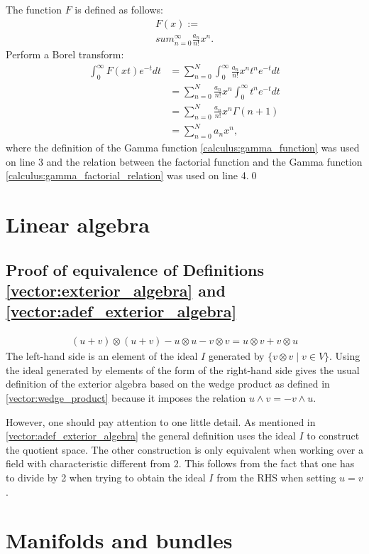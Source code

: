     The function $F$ is defined as follows:
    \begin{gather}
        F(x) := \\sum_{n=0}^\infty\frac{a_n}{n!}x^n.
    \end{gather}
    Perform a Borel transform:
    \begin{align*}
        \int_0^\infty F(xt)e^{-t}dt&=\sum_{n=0}^N\int_0^\infty\frac{a_n}{n!}x^nt^ne^{-t}dt\\
        &=\sum_{n=0}^N\frac{a_n}{n!}x^n\int_0^\infty t^ne^{-t}dt\\
        &=\sum_{n=0}^N\frac{a_n}{n!}x^n\Gamma(n+1)\\
        &=\sum_{n=0}^Na_nx^n,
   \end{align*}
   where the definition of the Gamma function \ref{calculus:gamma_function} was used on line 3 and the relation between the factorial function and the Gamma function \eqref{calculus:gamma_factorial_relation} was used on line 4.\qed

\section{Linear algebra}
\subsection{Proof of equivalence of Definitions \ref{vector:exterior_algebra} and \ref{vector:adef_exterior_algebra}}

    \begin{gather}
        (u+v)\otimes(u+v) - u\otimes u - v\otimes v = u\otimes v + v\otimes u
    \end{gather}
    The left-hand side is an element of the ideal $I$ generated by $\{v\otimes v\mid v\in V\}$. Using the ideal generated by elements of the form of the right-hand side gives the usual definition of the exterior algebra based on the wedge product as defined in \ref{vector:wedge_product} because it imposes the relation $u\wedge v = -v\wedge u$.

    However, one should pay attention to one little detail. As mentioned in \ref{vector:adef_exterior_algebra} the general definition uses the ideal $I$ to construct the quotient space. The other construction is only equivalent when working over a field with characteristic different from 2. This follows from the fact that one has to divide by 2 when trying to obtain the ideal $I$ from the RHS when setting $u=v$.

\section{Manifolds and bundles}

